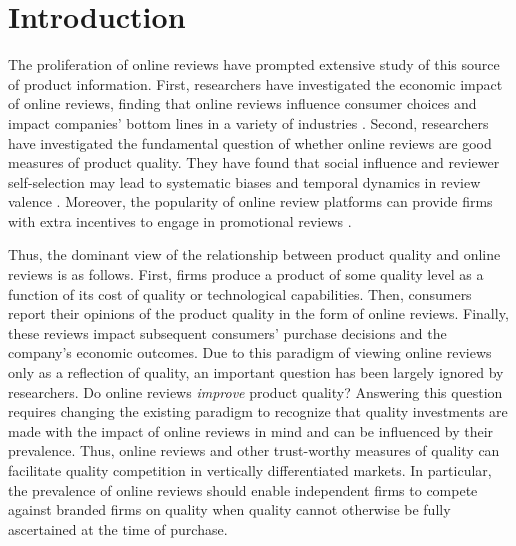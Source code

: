 \documentclass{informs_mod} %
\begin{document}
\section{Introduction} \label{sec:introduction}

The proliferation of online reviews have prompted extensive study of this source of product information. First, researchers have investigated the economic impact of online reviews, finding that online reviews influence consumer choices and impact companies' bottom lines in a variety of industries \citep{chevalier2006effect,zhu2010impact,ye2009impact}. Second, researchers have investigated the fundamental question of whether online reviews are good measures of product quality. They have found that social influence and reviewer self-selection may lead to systematic biases and temporal dynamics in review valence \citep{hu2006can, moe2012online, mcauley2013amateurs}. Moreover, the popularity of online review platforms can provide firms with extra incentives to engage in promotional reviews \citep{mayzlin2014promotional}. 

Thus, the dominant view of the relationship between product quality and online reviews  is as follows. First, firms produce a product of some quality level as a function of its cost of quality or technological capabilities. Then, consumers report their opinions of the product quality in the form of online reviews. Finally, these reviews impact subsequent consumers' purchase decisions and the company's economic outcomes. Due to this paradigm of viewing online reviews only as a reflection of quality, an important question has been largely ignored by researchers. Do online reviews \textit{improve} product quality? Answering this question requires changing the existing paradigm to recognize that quality investments are made with the impact of online reviews in mind and can be influenced by their prevalence. Thus, online reviews and other trust-worthy measures of quality can facilitate quality competition in vertically differentiated markets. In particular, the prevalence of online reviews should enable independent firms to compete against branded firms on quality when quality cannot otherwise be fully ascertained at the time of purchase.
\end{document}
